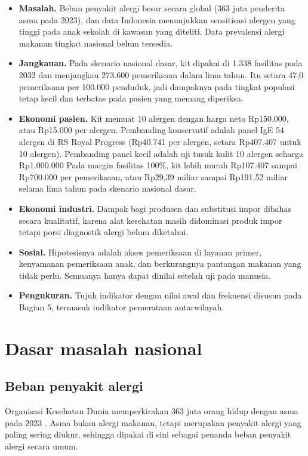 \documentclass[11pt,a4paper]{article}
\begin{document}
\begin{itemize}
\item \textbf{Masalah.} Beban penyakit alergi besar secara global (363 juta penderita asma pada 2023), dan data Indonesia menunjukkan sensitisasi alergen yang tinggi pada anak sekolah di kawasan yang diteliti. Data prevalensi alergi makanan tingkat nasional belum tersedia.
\item \textbf{Jangkauan.} Pada skenario nasional dasar, kit dipakai di 1.338 fasilitas pada 2032 dan menjangkau 273.600 pemeriksaan dalam lima tahun. Itu setara 47,0 pemeriksaan per 100.000 penduduk, jadi dampaknya pada tingkat populasi tetap kecil dan terbatas pada pasien yang memang diperiksa.
\item \textbf{Ekonomi pasien.} Kit memuat 10 alergen dengan harga neto Rp150.000, atau Rp15.000 per alergen. Pembanding konservatif adalah panel IgE 54 alergen di RS Royal Progress (Rp40.741 per alergen, setara Rp407.407 untuk 10 alergen). Pembanding panel kecil adalah uji tusuk kulit 10 alergen seharga Rp1.000.000 Pada margin fasilitas 100\%, kit lebih murah Rp107.407 sampai Rp700.000 per pemeriksaan, atau Rp29,39 miliar sampai Rp191,52 miliar selama lima tahun pada skenario nasional dasar.
\item \textbf{Ekonomi industri.} Dampak bagi produsen dan substitusi impor dibahas secara kualitatif, karena alat kesehatan masih didominasi produk impor tetapi porsi diagnostik alergi belum diketahui.
\item \textbf{Sosial.} Hipotesisnya adalah akses pemeriksaan di layanan primer, kenyamanan pemeriksaan anak, dan berkurangnya pantangan makanan yang tidak perlu. Semuanya hanya dapat dinilai setelah uji pada manusia.
\item \textbf{Pengukuran.} Tujuh indikator dengan nilai awal dan frekuensi disusun pada Bagian 5, termasuk indikator pemerataan antarwilayah.
\end{itemize}

\section{Dasar masalah nasional}

\subsection{Beban penyakit alergi}

Organisasi Kesehatan Dunia memperkirakan 363 juta orang hidup dengan asma pada 2023 \cite{who}. Asma bukan alergi makanan, tetapi merupakan penyakit alergi yang paling sering diukur, sehingga dipakai di sini sebagai penanda beban penyakit alergi secara umum.
\end{document}
